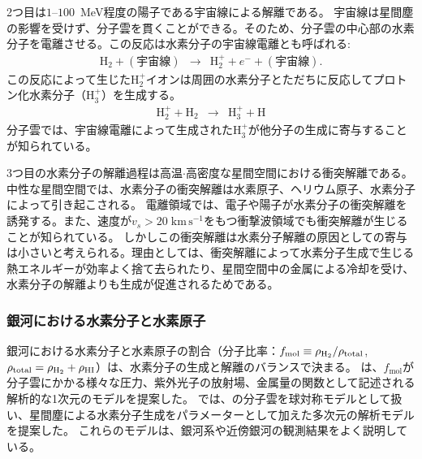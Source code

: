 2つ目は$1\mbox{--}100$~MeV程度の陽子である宇宙線による解離である。
宇宙線は星間塵の影響を受けず、分子雲を貫くことができる。そのため、分子雲の中心部の水素分子を電離させる。この反応は水素分子の宇宙線電離とも呼ばれる:
	\begin{eqnarray}
		\text{H}_2		+ (宇宙線) 	& \rightarrow & \text{H}^+_2 	+ e^-	+ (宇宙線) .
	\end{eqnarray}
この反応によって生じたH$_2^+$イオンは周囲の水素分子とただちに反応してプロトン化水素分子（H$^+_3$）を生成する。
	\begin{eqnarray}
		\text{H}_2^+	+ \text{H}_2	& \rightarrow & \text{H}^+_3 	+ \text{H}
	\end{eqnarray}
分子雲では、宇宙線電離によって生成されたH$^+_3$が他分子の生成に寄与することが知られている\citep{johnsen}。

3つ目の水素分子の解離過程は高温$\cdot$高密度な星間空間における衝突解離である。中性な星間空間では、水素分子の衝突解離は水素原子、ヘリウム原子、水素分子によって引き起こされる。
電離領域では、電子や陽子が水素分子の衝突解離を誘発する。また、速度が$v_s > 20\; \mbox{km} \, \mbox{s}^{-1}$をもつ衝撃波領域でも衝突解離が生じることが知られている\citep{1977ApJ...216..713K, 1977ApJ...217..442L}。
しかしこの衝突解離は水素分子解離の原因としての寄与は小さいと考えられる。理由としては、衝突解離によって水素分子生成で生じる熱エネルギーが効率よく捨て去られたり、星間空間中の金属による冷却を受け、水素分子の解離よりも生成が促進されるためである\citep[e.g.][]{1963ApJ...138..393G}。

\subsubsection{銀河における水素分子と水素原子}

銀河における水素分子と水素原子の割合（分子比率：$f_{\text{mol}}\equiv \rho_{{\rm H}_2} / \rho_{{\rm total}}$, $\rho_{{\rm total}}=\rho_{{\rm H}_2}+\rho_{\rm HI}$）は、水素分子の生成と解離のバランスで決まる。
\citet{1993ApJ...411..170E}は、$f_{\text{mol}}$が分子雲にかかる様々な圧力、紫外光子の放射場、金属量の関数として記述される解析的な1次元のモデルを提案した。
\citet{2008ApJ...689..865K}では、\citet{1993ApJ...411..170E}の分子雲を球対称モデルとして扱い、星間塵による水素分子生成をパラメーターとして加えた多次元の解析モデルを提案した。
これらのモデルは、銀河系や近傍銀河の観測結果をよく説明している\citep{1995A&A...296...33S, 1995A&A...304....1H, 2004ApJ...612L..29B, 2008AJ....136.2782L}。

